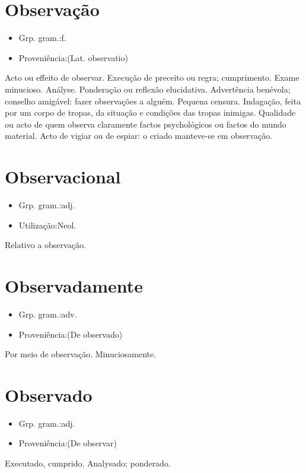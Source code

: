 \section{Observação}
\begin{itemize}
\item {Grp. gram.:f.}
\end{itemize}
\begin{itemize}
\item {Proveniência:(Lat. \textunderscore observatio\textunderscore )}
\end{itemize}
Acto ou effeito de observar.
Execução de preceito ou regra; cumprimento.
Exame minucioso.
Anályse.
Ponderação ou reflexão elucidativa.
Advertência benévola; conselho amigável: \textunderscore fazer observações a alguém\textunderscore .
Pequena censura.
Indagação, feita por um corpo de tropas, da situação e condições das tropas inimigas.
Qualidade ou acto de quem observa claramente factos psychológicos ou factos do mundo material.
Acto de vigiar ou de espiar: \textunderscore o criado manteve-se em observação\textunderscore .
\section{Observacional}
\begin{itemize}
\item {Grp. gram.:adj.}
\end{itemize}
\begin{itemize}
\item {Utilização:Neol.}
\end{itemize}
Relativo a observação.
\section{Observadamente}
\begin{itemize}
\item {Grp. gram.:adv.}
\end{itemize}
\begin{itemize}
\item {Proveniência:(De \textunderscore observado\textunderscore )}
\end{itemize}
Por meio de observação.
Minuciosamente.
\section{Observado}
\begin{itemize}
\item {Grp. gram.:adj.}
\end{itemize}
\begin{itemize}
\item {Proveniência:(De \textunderscore observar\textunderscore )}
\end{itemize}
Executado, cumprido.
Analysado; ponderado.
